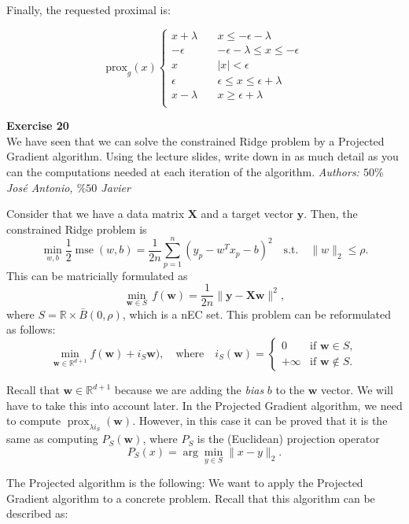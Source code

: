 \documentclass[11pt,table]{article}
\newenvironment{problem}[2][Exercise]
{ \begin{mdframed}[backgroundcolor=gray!20] \textbf{#1 #2} \\}
	{\hspace{0.0cm}\newline\newline \emph{Authors: \(50\%\) José Antonio, \(\%50\) Javier}  \end{mdframed}}
\newcommand\R{\mathbb R}
\begin{document}
Finally, the requested proximal is:

\[
	\text{prox}_g(x) \begin{cases}
		x + \lambda \quad & x \le -\epsilon-\lambda               \\
		-\epsilon \quad   & -\epsilon-\lambda \le x \le -\epsilon \\
		x \quad           & |x| < \epsilon                        \\
		\epsilon \quad    & \epsilon \le x \le \epsilon+\lambda   \\
		x-\lambda \quad   & x \ge \epsilon+\lambda                \\
	\end{cases}
\]

\begin{problem}{20}
We have seen that we can solve the constrained Ridge problem by a Projected Gradient algorithm. Using the lecture slides, write down in as much detail as you can the computations needed at each iteration of the algorithm.
\end{problem}

Consider that we have a data matrix \(\mathbf{X}\) and a target vector \(\mathbf{y}\). Then, the constrained Ridge problem is
\[
	\min_{w,b}\frac{1}{2} \operatorname{mse}(w,b)= \frac{1}{2n}\sum_{p=1}^n (y_p-w^Tx_p-b)^2 \quad \text{s.t.} \quad \|w\|_2\leq \rho.
\]
This can be matricially formulated as
\[
	\min_{\mathbf{w}\in S} \, f(\mathbf{ w})=\frac{1}{2n}\|\mathbf{y} - \mathbf{Xw}\|^2,
\]
where $S=\mathbb R \times \bar B(0, \rho)$, which is a nEC set. This problem can be reformulated as follows:
\[
	\min_{\mathbf{w} \in \mathbb R^{d+1}} f(\mathbf{w}) + i_S\mathbf{w}), \quad \text{where} \quad i_S(\mathbf{w})=\begin{cases}0 & \text{if } \mathbf{w}\in S,\\ +\infty & \text{if } \mathbf{w} \notin S.\end{cases}
\]

Recall that \(\mathbf{w}\in \R^{d+1}\) because we are adding the \emph{bias} \(b\) to the \(\mathbf{w}\) vector. We will have to take this into account later. In the Projected Gradient algorithm, we need to compute  $\operatorname{prox}_{\lambda i_S}(\mathbf{w})$. However, in this case it can be proved that it is the same as computing $P_S(\mathbf{w})$, where $P_S$ is the (Euclidean) projection operator
\[
	P_S(x)=\arg\min_{y\in S} \|x-y\|_2.
\]

The Projected algorithm is the following:
We want to apply the Projected Gradient algorithm to a concrete problem. Recall that this algorithm can be described as:
\end{document}
